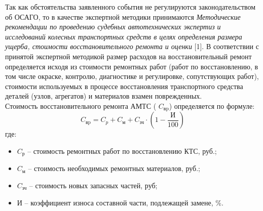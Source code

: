 %
%
%
%
%
%
\par  Так как обстоятельства заявленного события не регулируются законодательством об ОСАГО, то в качестве экспертной методики принимаются \emph{Методические рекомендации по проведению судебных автотехнических экспертиз и исследований колесных транспортных средств в целях определения размера ущерба, стоимости восстановительного ремонта и оценки} [1].
В соответствии с принятой экспертной методикой размер расходов на восстановительный ремонт определяется исходя из стоимости ремонтных работ (работ по восстановлению, в том числе окраске, контролю, диагностике и регулировке, сопутствующих работ), стоимости используемых в процессе восстановления транспортного средства деталей (узлов, агрегатов) и материалов взамен поврежденных.\\
%                                         
Стоимость восстановительного ремонта АМТС ( $ C_\text{вp} $) определяется по формуле:
%
\begin{equation}\label{eq:r}
C_\text{вp} =C_p + C_\text{м} + C_\text{зч}\cdot\left(1-\dfrac{ \text{И}}{100} \right) 
\end{equation}
%
\noindent где:
%
\begin{itemize}
%	
\item[ ]$C_\text {р} $ --  стоимость ремонтных работ по восстановлению КТС, руб.;
\item[ ]$ C_\text{м} $ --  стоимость необходимых ремонтных материалов, руб.;
\item[ ]$ C_\text{зч} $ --  стоимость новых запасных частей, руб;
\item[ ] $ \text{И} $ -- коэффициент износа составной части, подлежащей замене, \%.
\end{itemize}
